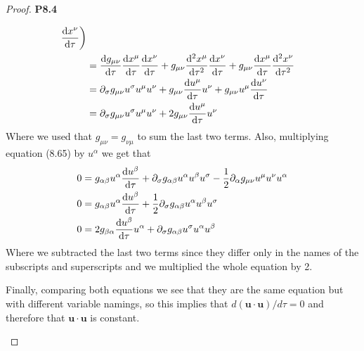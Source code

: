 \documentclass[11pt]{article}
\theoremstyle{definition}
\begin{document}
\begin{proof}{\textbf{P8.4}}
\begin{itemize}
\begin{align*}
            \derivative{x^\nu}{\tau}\bigg)\\
            &=
            \derivative{g_{\mu\nu}}{\tau}\derivative{x^\mu}{\tau}
            \derivative{x^\nu}{\tau}
            + g_{\mu\nu}\derivative[2]{x^\mu}{\tau}
            \derivative{x^\nu}{\tau}
            + g_{\mu\nu}\derivative{x^\mu}{\tau}
            \derivative[2]{x^\nu}{\tau}\\
            &=
            \partial_\sigma g_{\mu\nu} u^\sigma u^\mu u^\nu
            + g_{\mu\nu}\derivative{u^\mu}{\tau}u^\nu
            + g_{\mu\nu}u^\mu\derivative{u^\nu}{\tau}\\
            &=
            \partial_\sigma g_{\mu\nu} u^\sigma u^\mu u^\nu
            + 2g_{\mu\nu}\derivative{u^\mu}{\tau}u^\nu
        \end{align*}
        Where we used that $g_{\mu\nu} = g_{\nu\mu}$ to sum the last two terms.
        Also, multiplying equation (8.65) by $u^\alpha$ we get that
        \begin{align*}
            0 &=
            g_{\alpha\beta}u^\alpha\derivative{u^\beta}{\tau}
            + \partial_\sigma g_{\alpha\beta} u^\alpha u^\beta u^\sigma  
            - \frac{1}{2}\partial_\alpha g_{\mu\nu}u^\mu u^\nu u^\alpha\\
            0 &=
            g_{\alpha\beta}u^\alpha\derivative{u^\beta}{\tau}
            + \frac{1}{2}\partial_\sigma g_{\alpha\beta} u^\alpha u^\beta u^\sigma\\
            0 &=
            2g_{\beta\alpha}\derivative{u^\beta}{\tau}u^\alpha
            + \partial_\sigma g_{\alpha\beta} u^\sigma u^\alpha u^\beta
        \end{align*}
        Where we subtracted the last two terms since they differ only in the
        names of the subscripts and superscripts and we multiplied the whole
        equation by 2.
        
        Finally, comparing both equations we see that they are the same
        equation but with different variable namings, so this implies that
        $d(\bm{u}\cdot\bm{u})/d\tau = 0$ and therefore that $\bm{u}\cdot\bm{u}$
        is constant.
    \end{itemize}
\end{proof}
\end{document}
